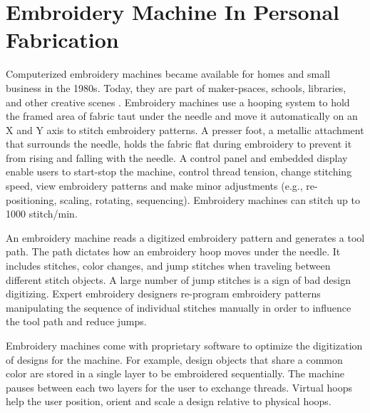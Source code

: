 \documentclass[header.tex]{subfiles}
\begin{document}



\section{Embroidery Machine In Personal Fabrication}
Computerized embroidery machines became available for homes and small business in the 1980s. Today, they are part of maker-psaces, schools, libraries, and other creative scenes \cite{}. 
Embroidery machines use a hooping system to hold the framed area of fabric taut under the needle and move it automatically on an X and Y axis to stitch embroidery patterns. A presser foot, a metallic attachment that surrounds the needle, holds the fabric flat during embroidery to prevent it from rising and falling with the needle. A control panel and embedded display enable users to start-stop the machine, control thread tension, change stitching speed, view embroidery patterns and make minor adjustments (e.g., re-positioning, scaling, rotating, sequencing). Embroidery machines can stitch up to 1000 stitch/min.

An embroidery machine reads a digitized embroidery pattern %
and generates a tool path. The path dictates how an embroidery hoop moves under the needle. It includes stitches, color changes, and jump stitches when traveling between different stitch objects. 
A large number of jump stitches is a sign of bad design digitizing. Expert embroidery designers re-program embroidery patterns manipulating the sequence of individual stitches manually in order to influence the tool path and reduce jumps.

Embroidery machines come with proprietary software to optimize the digitization of designs for the machine. For example, 
design objects that share a common color are stored in a single layer to be embroidered sequentially. %
The machine pauses between each two layers for the user to exchange threads. Virtual hoops help the user position, orient and scale a design relative to physical hoops. 
\end{document}

